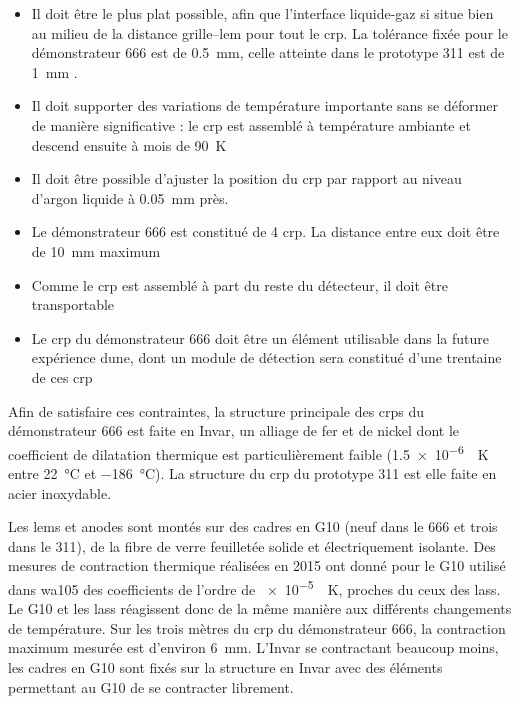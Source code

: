             \begin{itemize}
                \item Il doit être le plus plat possible, afin que l'interface liquide-gaz si situe bien au milieu de la distance grille--\gls{lem} pour tout le \gls{crp}. La tolérance fixée pour le démonstrateur 666 est de \SI{0.5}{\milli\meter}, celle atteinte dans le prototype 311 est de \SI{1}{\milli\meter} \cite{Aimard2018}.
                \item Il doit supporter des variations de température importante sans se déformer de manière significative : le \gls{crp} est assemblé à température ambiante et descend ensuite à mois de \SI{90}{\kelvin}
                \item Il doit être possible d'ajuster la position du \gls{crp} par rapport au niveau d'argon liquide à \SI{0.05}{\milli\meter} près.
                \item Le démonstrateur 666 est constitué de 4 \gls{crp}. La distance entre eux doit être de \SI{10}{\milli\meter} maximum
                \item Comme le \gls{crp} est assemblé à part du reste du détecteur, il doit être transportable
                \item Le \gls{crp} du démonstrateur 666 doit être un élément utilisable dans la future expérience \gls{dune}, dont un module de détection sera constitué d'une trentaine de ces \gls{crp}
            \end{itemize}
            
            Afin de satisfaire ces contraintes, la structure principale des \glspl{crp} du démonstrateur 666 est faite en Invar, un alliage de fer et de nickel dont le coefficient de dilatation thermique est particulièrement faible (\SI{1.5e-6}{\per\kelvin} entre \SI{22}{\celsius} et \SI{-186}{\celsius}). La structure du \gls{crp} du prototype 311 est elle faite en acier inoxydable.
            
            Les \glspl{lem} et anodes sont montés sur des cadres en G10 (neuf dans le 666 et trois dans le 311), de la fibre de verre feuilletée solide et électriquement isolante. Des mesures de contraction thermique réalisées en 2015 ont donné pour le G10 utilisé dans \gls{wa105} des coefficients de l'ordre de \SI{e-5}{\per\kelvin}, proches du ceux des \glspl{las}. Le G10 et les \glspl{las} réagissent donc de la même manière aux différents changements de température. Sur les trois mètres du \gls{crp} du démonstrateur 666, la contraction maximum mesurée est d'environ \SI{6}{\milli\meter}. L'Invar se contractant beaucoup moins, les cadres en G10 sont fixés sur la structure en Invar avec des éléments permettant au G10 de se contracter librement.
            
